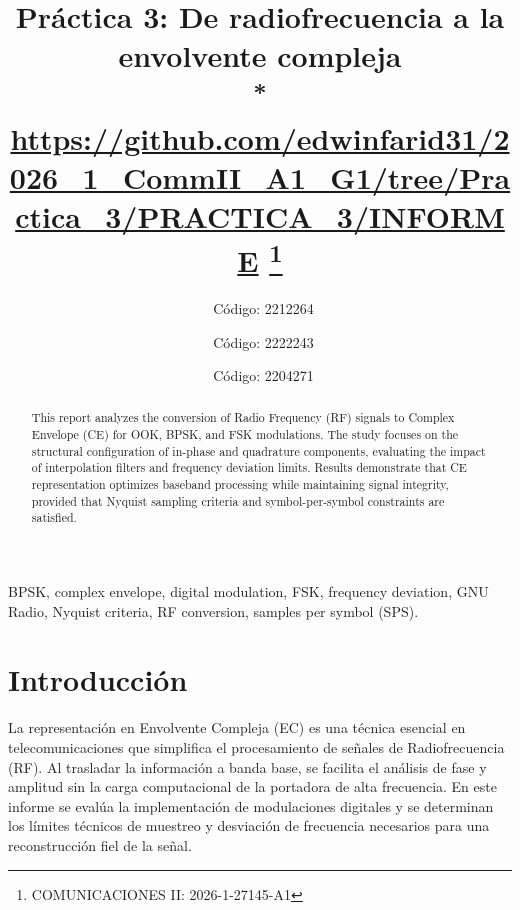 \documentclass[conference]{IEEEtran}
\begin{document}
\title{Práctica 3: De radiofrecuencia a la envolvente compleja\\
{\footnotesize \textsuperscript{*} \url{https://github.com/edwinfarid31/2026_1_CommII_A1_G1/tree/Practica_3/PRACTICA_3/INFORME}}
\thanks{COMUNICACIONES II: 2026-1-27145-A1}
}

\author{
\
{\small Código: 2212264}
\and
{}\
{\small Código: 2222243}
\and
{}\
{\small Código: 2204271}
}

\maketitle

\begin{abstract}
This report analyzes the conversion of Radio Frequency (RF) signals to Complex Envelope (CE) for OOK, BPSK, and FSK modulations. The study focuses on the structural configuration of in-phase and quadrature components, evaluating the impact of interpolation filters and frequency deviation limits. Results demonstrate that CE representation optimizes baseband processing while maintaining signal integrity, provided that Nyquist sampling criteria and symbol-per-symbol constraints are satisfied.
\end{abstract}

\begin{IEEEkeywords}
BPSK, complex envelope, digital modulation, FSK, frequency deviation, GNU Radio, Nyquist criteria, RF conversion, samples per symbol (SPS).
\end{IEEEkeywords}

\section{Introducción}
La representación en Envolvente Compleja (EC) es una técnica esencial en telecomunicaciones que simplifica el procesamiento de señales de Radiofrecuencia (RF). Al trasladar la información a banda base, se facilita el análisis de fase y amplitud sin la carga computacional de la portadora de alta frecuencia. En este informe se evalúa la implementación de modulaciones digitales y se determinan los límites técnicos de muestreo y desviación de frecuencia necesarios para una reconstrucción fiel de la señal.
\end{document}
